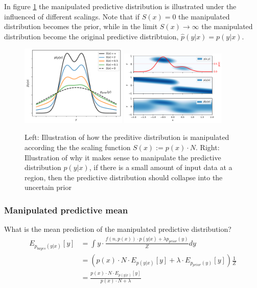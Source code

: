 In figure \ref{pred_dist_manipulation} the manipulated predictive 
distribution is illustrated under the influenced of different scalings. 
Note that if $S(x) = 0$ the manipulated distribution becomes the prior,
while in the limit $S(x) \rightarrow \infty$ the manipulated distribution
become the original predictive distribtuion, $\hat p(y|x) = p(y|x)$. 

\begin{figure}[H]
    \centering
    \includegraphics[width=0.45\textwidth]{Pictures/mixture_predictive_bayesian.pdf}
    \includegraphics[width=0.45\textwidth]{Pictures/mixture_predictive_bayesian2D.pdf}
    \caption{Left: Illustration of how the preditive distribution is manipulated according
    the the scaling function $S(x) := p(x)\cdot N$. Right: Illustration of why it makes
    sense to manipulate the predictive distribution $p(y|x)$, if there is a small amount of input data
    at a region, then the predictive distribution should collapse into the uncertain prior}
    \label{pred_dist_manipulation}
\end{figure}

\subsubsection{Manipulated predictive mean}
What is the mean prediction of the manipulated predictive distribution?
\begin{align*}
    E_{p_{bayes}(y|x)}[y] &= \int y \cdot \frac{f(n,p(x)) \cdot p(y|x) + \lambda p_{prior}(y)}{Z} dy\\
    &= \left(p(x)\cdot N \cdot E_{p(y|x)}[y] + \lambda \cdot E_{p_{prior}(y)}[y] \right) \frac{1}{Z}\\
    &= \frac{p(x)\cdot N\cdot E_{p(y|x)}[y]}{p(x)\cdot N+\lambda}
\end{align*}

